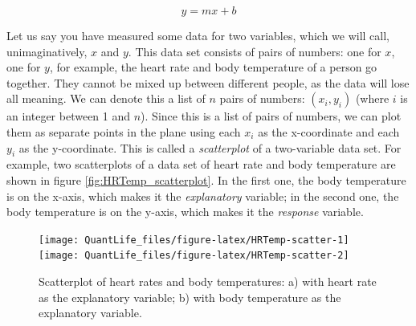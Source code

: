 \documentclass[
]{book}
\newenvironment{Shaded}{\begin{snugshade}}{\end{snugshade}}
\newcommand{\DataTypeTok}[1]{\textcolor[rgb]{0.13,0.29,0.53}{#1}}
\newcommand{\FloatTok}[1]{\textcolor[rgb]{0.00,0.00,0.81}{#1}}
\newcommand{\KeywordTok}[1]{\textcolor[rgb]{0.13,0.29,0.53}{\textbf{#1}}}
\newcommand{\NormalTok}[1]{#1}
\newcommand{\OperatorTok}[1]{\textcolor[rgb]{0.81,0.36,0.00}{\textbf{#1}}}
\newcommand{\OtherTok}[1]{\textcolor[rgb]{0.56,0.35,0.01}{#1}}
\newcommand{\StringTok}[1]{\textcolor[rgb]{0.31,0.60,0.02}{#1}}
\theoremstyle{definition}
\theoremstyle{definition}
\theoremstyle{definition}
\theoremstyle{remark}
\begin{document}
\[ y = mx + b\]

Let us say you have measured some data for two variables, which we will call, unimaginatively, \(x\) and \(y\). This data set consists of pairs of numbers: one for \(x\), one for \(y\), for example, the heart rate and body temperature of a person go together. They cannot be mixed up between different people, as the data will lose all meaning. We can denote this a list of \(n\) pairs of numbers: \((x_i, y_i)\) (where \(i\) is an integer between 1 and \(n\)). Since this is a list of pairs of numbers, we can plot them as separate points in the plane using each \(x_i\) as the x-coordinate and each \(y_i\) as the y-coordinate. This is called a  \emph{scatterplot} of a two-variable data set. For example, two scatterplots of a data set of heart rate and body temperature are shown in figure \ref{fig:HRTemp_scatterplot}. In the first one, the body temperature is on the x-axis, which makes it the  \emph{explanatory} variable; in the second one, the body temperature is on the y-axis, which makes it the  \emph{response} variable.

\begin{Shaded}
\end{Shaded}

\begin{figure}

{\centering \texttt{[image: QuantLife\_files/figure-latex/HRTemp-scatter-1]} \texttt{[image: QuantLife\_files/figure-latex/HRTemp-scatter-2]} 

}

\caption{Scatterplot of heart rates and body temperatures: a) with heart rate as the explanatory variable; b) with body temperature as the explanatory variable.}\label{fig:HRTemp-scatter}
\end{figure}
\end{document}
